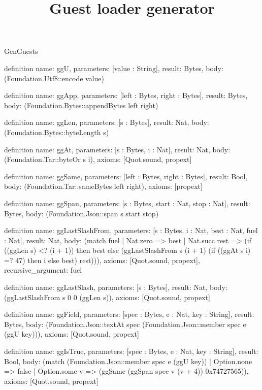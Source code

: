 \begin{lexlean}{GenGuests}
\title{Guest loader generator}
\begin{semanticmodule}
definition{
  name: ggU,
  parameters: [value : String],
  result: Bytes,
  body: (Foundation.Utf8::encode value)
}

definition{
  name: ggApp,
  parameters: [left : Bytes, right : Bytes],
  result: Bytes,
  body: (Foundation.Bytes::appendBytes left right)
}

definition{
  name: ggLen,
  parameters: [s : Bytes],
  result: Nat,
  body: (Foundation.Bytes::byteLength s)
}

definition{
  name: ggAt,
  parameters: [s : Bytes, i : Nat],
  result: Nat,
  body: (Foundation.Tar::byteOr s i),
  axioms: [Quot.sound, propext]
}

definition{
  name: ggSame,
  parameters: [left : Bytes, right : Bytes],
  result: Bool,
  body: (Foundation.Tar::sameBytes left right),
  axioms: [propext]
}

definition{
  name: ggSpan,
  parameters: [s : Bytes, start : Nat, stop : Nat],
  result: Bytes,
  body: (Foundation.Json::span s start stop)
}

definition{
  name: ggLastSlashFrom,
  parameters: [s : Bytes, i : Nat, best : Nat, fuel : Nat],
  result: Nat,
  body: (match fuel
    | Nat.zero => best
    | Nat.succ rest => (if ((ggLen s) <? (i + 1)) then best else (ggLastSlashFrom s (i + 1) (if ((ggAt s i) =? 47) then i else best) rest))),
  axioms: [Quot.sound, propext],
  recursive_argument: fuel
}

definition{
  name: ggLastSlash,
  parameters: [s : Bytes],
  result: Nat,
  body: (ggLastSlashFrom s 0 0 (ggLen s)),
  axioms: [Quot.sound, propext]
}

definition{
  name: ggField,
  parameters: [spec : Bytes, e : Nat, key : String],
  result: Bytes,
  body: (Foundation.Json::textAt spec (Foundation.Json::member spec e (ggU key))),
  axioms: [Quot.sound, propext]
}

definition{
  name: ggIsTrue,
  parameters: [spec : Bytes, e : Nat, key : String],
  result: Bool,
  body: (match (Foundation.Json::member spec e (ggU key))
    | Option.none => false
    | Option.some v => (ggSame (ggSpan spec v (v + 4)) 0x74727565)),
  axioms: [Quot.sound, propext]
}


\end{semanticmodule}
\end{lexlean}
